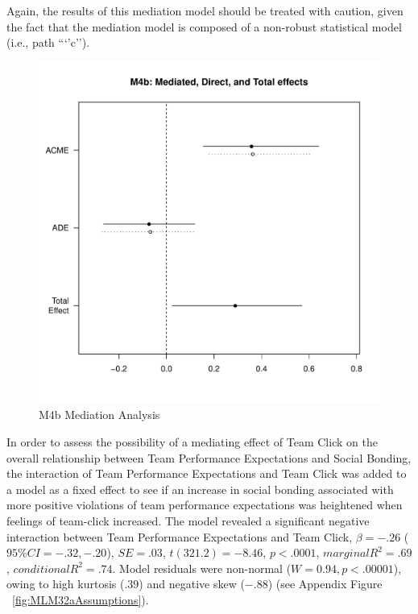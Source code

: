   Again, the results of this mediation model should be treated with caution, given the fact that the mediation model is composed of a non-robust statistical model (i.e., path ```'c'').

  \begin{figure}[htbp]
    \centering
    \includegraphics[scale = .5]{images/MLM4bMediationEffects.pdf}
    \caption{M4b Mediation Analysis}
    \label{fig:MLM4bMediationAnalysis}
  \end{figure}




In order to assess the possibility of a mediating effect of Team Click on the overall relationship between Team Performance Expectations and Social Bonding, the interaction of Team Performance Expectations and Team Click was added to a model as a fixed effect to see if an increase in social bonding associated with more positive violations of team performance expectations was heightened when feelings of team-click increased. The model revealed a significant negative interaction between Team Performance Expectations and Team Click,  $\beta = -.26$ ($95\% CI =  -.32, -.20$), $SE = .03$, $t(321.2) = -8.46$, $p < .0001$, $marginal R^2 = .69$, $conditional R^2 = .74$.  Model residuals were non-normal ($W = 0.94, p < .00001$), owing to high kurtosis ($.39$) and negative skew ($-.88$) (see Appendix Figure ~\ref{fig:MLM32aAssumptions}).

